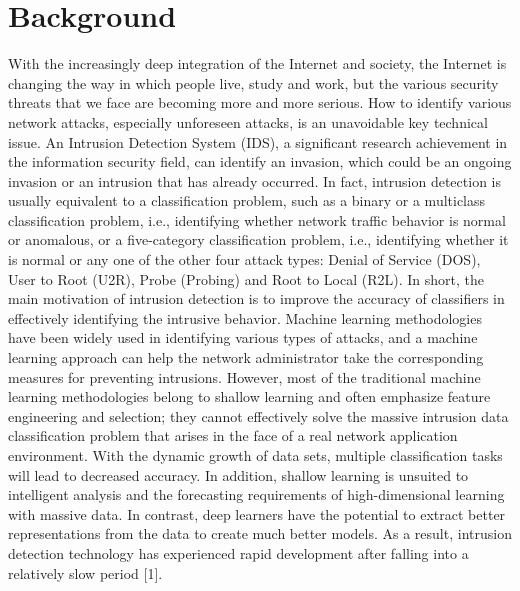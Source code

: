 \section{Background}\label{sec:bkgrnd}%
\vspace{-18pt}
With the increasingly deep integration of the Internet and society, the Internet is changing the way in which people live, study and work, but the various security threats that we face are becoming more and more serious. How to identify various network attacks, especially unforeseen attacks, is an unavoidable key technical issue. An Intrusion Detection System (IDS), a significant research achievement in the information security field, can identify an invasion, which could be an ongoing invasion or an intrusion that has already occurred. In fact, intrusion detection is usually equivalent to a classification problem, such as a binary or a multiclass classification problem, i.e., identifying whether network traffic behavior is normal or anomalous, or a five-category classification problem, i.e., identifying whether it is normal or any one of the other four attack types: Denial of Service (DOS), User to Root (U2R), Probe (Probing) and Root to Local (R2L). In short, the main motivation of intrusion detection is to improve the accuracy of classifiers in effectively identifying the intrusive behavior.
Machine learning methodologies have been widely used in identifying various types of attacks, and a machine learning approach can help the network administrator take the corresponding measures for preventing intrusions. However, most of the traditional machine learning methodologies belong to shallow learning and often emphasize feature engineering and selection; they cannot effectively solve the massive intrusion data classification problem that arises in the face of a real network application environment. With the dynamic growth of data sets, multiple classification tasks will lead to decreased accuracy. In addition, shallow learning is unsuited to intelligent analysis and the forecasting requirements of high-dimensional learning with massive data. In contrast, deep learners have the potential to extract better representations from the data to create much better models. As a result, intrusion detection technology has experienced rapid development after falling into a relatively slow period [1].%
